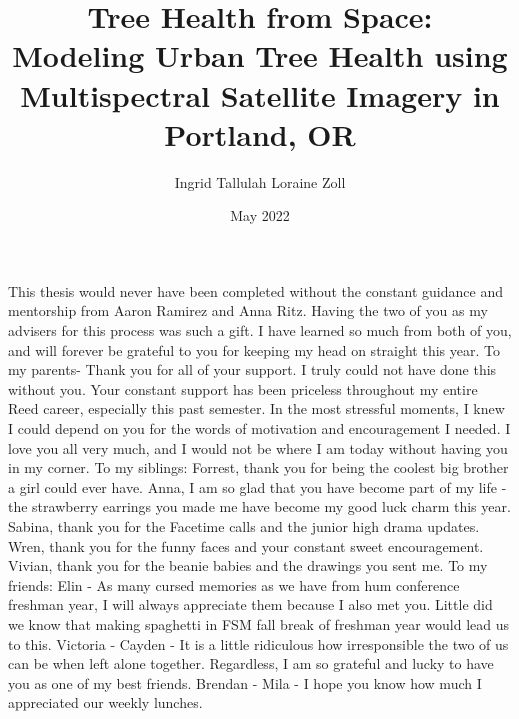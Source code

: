 \documentclass[12pt,twoside]{reedthesis}
\title{Tree Health from Space: \\[1ex] Modeling Urban Tree Health using Multispectral Satellite Imagery in Portland, OR}
\author{Ingrid Tallulah Loraine Zoll}
\date{May 2022}
\begin{document}
  \maketitle

\frontmatter %
\pagestyle{empty} %
  \begin{acknowledgements}
    This thesis would never have been completed without the constant guidance and mentorship from Aaron Ramirez and Anna Ritz. Having the two of you as my advisers for this process was such a gift. I have learned so much from both of you, and will forever be grateful to you for keeping my head on straight this year. To my parents- Thank you for all of your support. I truly could not have done this without you. Your constant support has been priceless throughout my entire Reed career, especially this past semester. In the most stressful moments, I knew I could depend on you for the words of motivation and encouragement I needed. I love you all very much, and I would not be where I am today without having you in my corner. To my siblings: Forrest, thank you for being the coolest big brother a girl could ever have. Anna, I am so glad that you have become part of my life - the strawberry earrings you made me have become my good luck charm this year. Sabina, thank you for the Facetime calls and the junior high drama updates. Wren, thank you for the funny faces and your constant sweet encouragement. Vivian, thank you for the beanie babies and the drawings you sent me. To my friends: Elin - As many cursed memories as we have from hum conference freshman year, I will always appreciate them because I also met you. Little did we know that making spaghetti in FSM fall break of freshman year would lead us to this. Victoria - Cayden - It is a little ridiculous how irresponsible the two of us can be when left alone together. Regardless, I am so grateful and lucky to have you as one of my best friends. Brendan - Mila - I hope you know how much I appreciated our weekly lunches.
  \end{acknowledgements}
\end{document}
